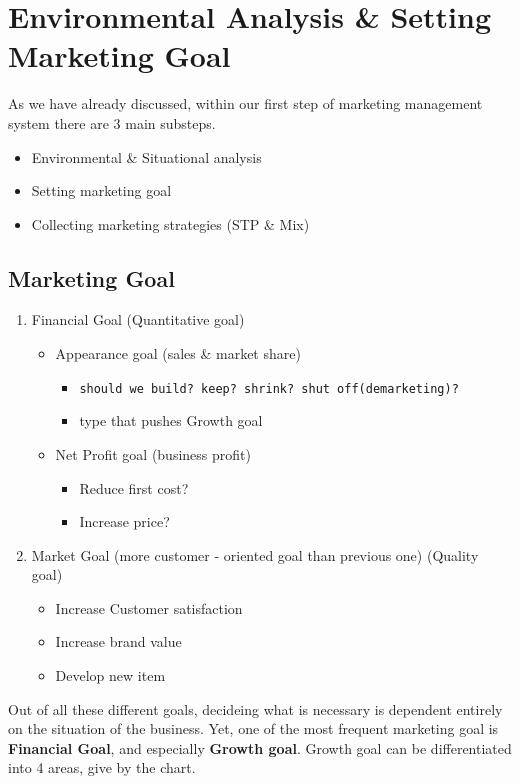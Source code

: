 \documentclass[12pt]{article}
\begin{document}
\section{Environmental Analysis \& Setting Marketing Goal}


As we have already discussed, within our first step of marketing management system there are 3 main substeps.
\begin{itemize}
	\item Environmental \& Situational analysis
	\item Setting marketing goal
	\item Collecting marketing strategies (STP \& Mix)
\end{itemize}

\subsection{Marketing Goal}

\begin{enumerate}
	\item Financial Goal (Quantitative goal)
	\begin{itemize}
		\item Appearance goal (sales \& market share)
		\begin{itemize}
			\item \texttt{should we build? keep? shrink? shut off(demarketing)?}
			\item type that pushes Growth goal
		\end{itemize}
		\item Net Profit goal (business profit)
		\begin{itemize}
			\item Reduce first cost?
			\item Increase price?
		\end{itemize}
	\end{itemize}
	\item Market Goal (more customer - oriented goal than previous one) (Quality goal)
	\begin{itemize}
		\item Increase Customer satisfaction
		\item Increase brand value
		\item Develop new item
	\end{itemize}
\end{enumerate}

Out of all these different goals, decideing what is necessary is dependent entirely on the situation of the business. Yet, one of the most frequent marketing goal is \textbf{Financial Goal}, and especially \textbf{Growth goal}. Growth goal can be differentiated into 4 areas, give by the chart.
\end{document}
